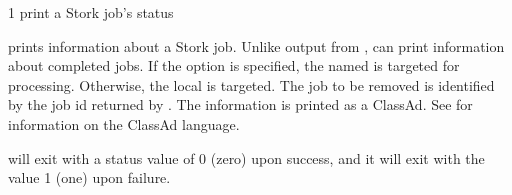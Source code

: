 \begin{ManPage}{\label{man-stork-status}}{1}
{print a Stork job's status}
\Synopsis {}
\ToolArgsBase

\Storkname
{}



\Description 

 prints information about a Stork job.  Unlike output from
,  can print information about completed jobs.
If the  option is specified, the named  is targeted
for processing.  Otherwise, the local  is targeted.
The job to be removed is identified by the job id returned by  .
The information is printed as a ClassAd.
See  for information
on the ClassAd language.

\begin{Options}
	\ToolArgsBaseDesc
	\StorknameDesc
\end{Options}

\ExitStatus

 will exit with a status value of 0 (zero) upon success,
and it will exit with the value 1 (one) upon failure.

\end{ManPage}
